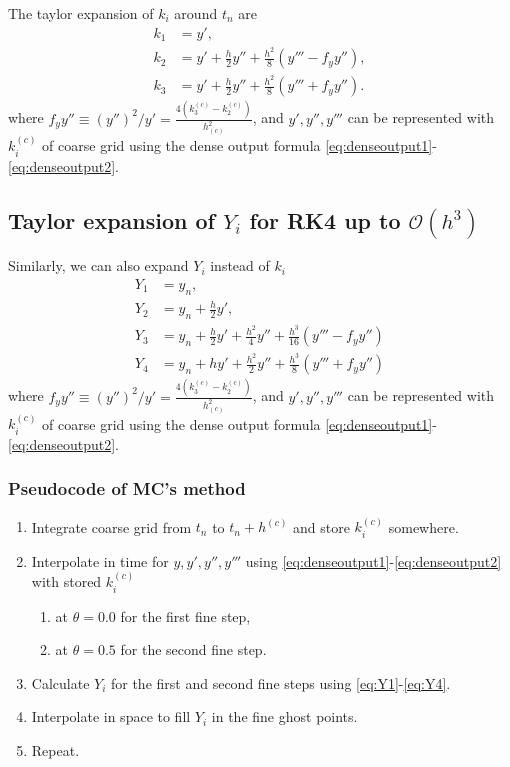 \documentclass[prd,aps,a4paper,superscriptaddress,onecolumn,footinbib]{revtex4}
\begin{document}
The taylor expansion of $k_i$ around $t_n$ are \cite{mongwane2015toward}
\begin{align}
    k_1&=y', \\
    k_2&=y'+\frac{h}{2}y''+\frac{h^2}{8}(y'''-f_yy''), \\
    k_3&=y'+\frac{h}{2}y''+\frac{h^2}{8}(y'''+f_yy'').
\end{align}
where
$f_yy''\equiv\left(y''\right)^2/y'=\frac{4(k^{(c)}_3-k^{(c)}_2)}{h^2_{(c)}}$,
and $y',y'',y'''$ can be represented with $k^{(c)}_i$ of coarse grid using the dense output formula \eqref{eq:denseoutput1}-\eqref{eq:denseoutput2}.

\subsection{Taylor expansion of $Y_i$ for RK4 up to $\mathcal{O}(h^3)$}

Similarly, we can also expand $Y_i$ instead of $k_i$ \cite{mccorquodale2011high}
\begin{align}
    Y_1&=y_n, \label{eq:Y1} \\
    Y_2&=y_n + \frac{h}{2}y', \label{eq:Y2} \\
    Y_3&=y_n + \frac{h}{2}y' + \frac{h^2}{4}y''+\frac{h^3}{16}(y'''-f_yy'') \label{eq:Y3} \\
    Y_4&=y_n + hy' + \frac{h^2}{2}y''+\frac{h^3}{8}(y'''+f_yy'') \label{eq:Y4}
\end{align}
where $f_yy''\equiv\left(y''\right)^2/y'=\frac{4(k^{(c)}_3-k^{(c)}_2)}{h^2_{(c)}}$,
and $y',y'',y'''$ can be represented with $k^{(c)}_i$ of coarse grid using the dense output formula \eqref{eq:denseoutput1}-\eqref{eq:denseoutput2}.

\subsubsection{Pseudocode of MC's method}
\begin{enumerate}
    \item Integrate coarse grid from $t_n$ to $t_n+h^{(c)}$ and store $k^{(c)}_i$
        somewhere.
    \item Interpolate in time for $y,y',y'',y'''$ using
        \eqref{eq:denseoutput1}-\eqref{eq:denseoutput2} with stored $k_i^{(c)}$
        \begin{enumerate}[label=(\alph*)]
            \item at $\theta=0.0$ for the first fine step,
            \item at $\theta=0.5$ for the second fine step.
        \end{enumerate}
    \item Calculate $Y_i$ for the first and second fine steps using \eqref{eq:Y1}-\eqref{eq:Y4}.
    \item Interpolate in space to fill $Y_i$ in the fine ghost points.
    \item Repeat.
\end{enumerate}





\end{document}
